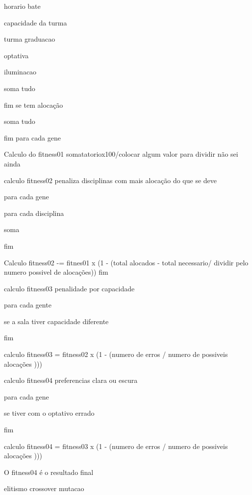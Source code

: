 horario bate

capacidade da turma

turma graduacao

optativa

iluminacao

soma tudo

fim se tem alocação

soma tudo

fim para cada gene

Calculo do fitness01 somatatoriox100/colocar algum valor  para dividir não sei ainda

calculo fitness02 penaliza disciplinas com mais alocação do que se deve

para cada gene 

para cada disciplina 

soma

fim

Calculo fitness02 -= fitnes01 x (1 - (total alocados - total necessario/ dividir pelo numero possivel de alocações))
fim

calculo fitness03 penalidade por capacidade

para cada gente

se a sala tiver capacidade diferente

fim

calculo fitness03 = fitness02 x (1 - (numero de erros /  numero de possiveis alocações )))


calculo fitness04 preferencias clara ou escura

para cada gene 

se tiver com o optativo errado 

fim	

calculo fitness04 = fitness03 x (1 - (numero de erros /  numero de possiveis alocações )))


O fitness04 é o resultado final



elitismo
crossover
mutacao
